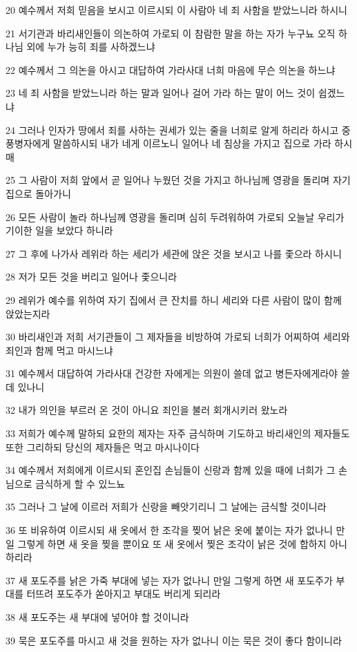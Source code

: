 \par 20 예수께서 저희 믿음을 보시고 이르시되 이 사람아 네 죄 사함을 받았느니라 하시니
\par 21 서기관과 바리새인들이 의논하여 가로되 이 참람한 말을 하는 자가 누구뇨 오직 하나님 외에 누가 능히 죄를 사하겠느냐
\par 22 예수께서 그 의논을 아시고 대답하여 가라사대 너희 마음에 무슨 의논을 하느냐
\par 23 네 죄 사함을 받았느니라 하는 말과 일어나 걸어 가라 하는 말이 어느 것이 쉽겠느냐
\par 24 그러나 인자가 땅에서 죄를 사하는 권세가 있는 줄을 너희로 알게 하리라 하시고 중풍병자에게 말씀하시되 내가 네게 이르노니 일어나 네 침상을 가지고 집으로 가라 하시매
\par 25 그 사람이 저희 앞에서 곧 일어나 누웠던 것을 가지고 하나님께 영광을 돌리며 자기 집으로 돌아가니
\par 26 모든 사람이 놀라 하나님께 영광을 돌리며 심히 두려워하여 가로되 오늘날 우리가 기이한 일을 보았다 하니라
\par 27 그 후에 나가사 레위라 하는 세리가 세관에 앉은 것을 보시고 나를 좇으라 하시니
\par 28 저가 모든 것을 버리고 일어나 좇으니라
\par 29 레위가 예수를 위하여 자기 집에서 큰 잔치를 하니 세리와 다른 사람이 많이 함께 앉았는지라
\par 30 바리새인과 저희 서기관들이 그 제자들을 비방하여 가로되 너희가 어찌하여 세리와 죄인과 함께 먹고 마시느냐
\par 31 예수께서 대답하여 가라사대 건강한 자에게는 의원이 쓸데 없고 병든자에게라야 쓸데 있나니
\par 32 내가 의인을 부르러 온 것이 아니요 죄인을 불러 회개시키러 왔노라
\par 33 저희가 예수께 말하되 요한의 제자는 자주 금식하며 기도하고 바리새인의 제자들도 또한 그리하되 당신의 제자들은 먹고 마시나이다
\par 34 예수께서 저희에게 이르시되 혼인집 손님들이 신랑과 함께 있을 때에 너희가 그 손님으로 금식하게 할 수 있느뇨
\par 35 그러나 그 날에 이르러 저희가 신랑을 빼앗기리니 그 날에는 금식할 것이니라
\par 36 또 비유하여 이르시되 새 옷에서 한 조각을 찢어 낡은 옷에 붙이는 자가 없나니 만일 그렇게 하면 새 옷을 찢을 뿐이요 또 새 옷에서 찢은 조각이 낡은 것에 합하지 아니하리라
\par 37 새 포도주를 낡은 가죽 부대에 넣는 자가 없나니 만일 그렇게 하면 새 포도주가 부대를 터뜨려 포도주가 쏟아지고 부대도 버리게 되리라
\par 38 새 포도주는 새 부대에 넣어야 할 것이니라
\par 39 묵은 포도주를 마시고 새 것을 원하는 자가 없나니 이는 묵은 것이 좋다 함이니라


